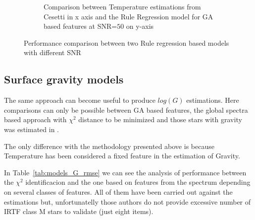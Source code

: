 \begin {figure}
\begin{subfigure}{.85\textwidth}
  \caption{Comparison between Temperature estimations from Cesetti 
 in x axis and the Rule Regression model for GA based features 
 at SNR=$50$ on y-axis}
 \label{fig:ga_rr50ga_spt}
 \end{subfigure} 
 \label {fig:comp02}
 \caption{Performance comparison between two Rule regression based models with different SNR}
\end {figure}
%
%

%
% 


%

\subsection{Surface gravity models}

The same approach can become useful to produce $log(G)$ estimations. 
Here comparisons can only be possible between GA based features, the 
global spectra based approach with $\chi^2$ distance
to be minimized and those stars with gravity was 
estimated in  \cite{2013A&A...549A.129C}.

The only difference with the methodology presented above is because
Temperature has been considered a fixed feature in the estimation of 
Gravity.

In Table~\ref{tab:models_G_rmse} 
we can see the analysis of performance between
the $\chi^2$ identificacion and the one based on features from the spectrum
depending on several classes of features. All of them have been carried out
against the \cite{Cesetti} estimations but, unfortunatelly those authors 
do not provide excessive number of IRTF class M stars to validate (just eight items).

